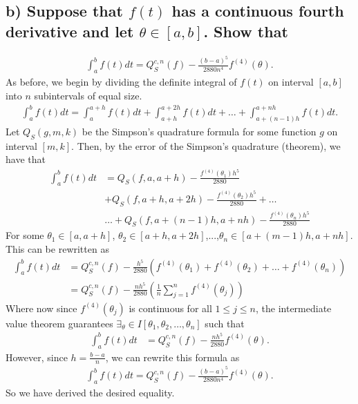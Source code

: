\documentclass[11pt, letterpaper]{article}
\begin{document}
\subsection*{b) \normalfont Suppose that $f(t)$ has a continuous fourth derivative and let $\theta\in[a,b]$. Show that}
\begin{align*}
    \int_a^b f(t)dt=Q_S^{c,n}(f)-\frac{(b-a)^5}{2880n^4}f^{(4)}(\theta).
\end{align*}
As before, we begin by dividing the definite integral of $f(t)$ on interval $[a,b]$ into $n$ subintervals of equal size.
\begin{align*}
    \int_a^b f(t)dt=\int_a^{a+h} f(t)dt +\int_{a+h}^{a+2h}f(t)dt +\dots+ \int_{a+(n-1)h}^{a+nh}f(t)dt.
\end{align*}
Let $Q_S(g,m,k)$ be the Simpson's quadrature formula for some function $g$ on interval $[m,k]$. Then, by the error of the Simpson's quadrature (theorem), we have that
\begin{align*}
    \int_a^b f(t)dt&=Q_S(f,a,a+h)-\frac{f^{(4)}(\theta_1)h^5}{2880}\\
    &+Q_S(f,a+h,a+2h)-\frac{f^{(4)}(\theta_2)h^5}{2880}+\dots\\
    &\dots+Q_S(f,a+(n-1)h,a+nh)-\frac{f^{(4)}(\theta_n)h^5}{2880}
\end{align*}
For some $\theta_1\in[a,a+h]$, $\theta_2\in[a+h,a+2h]$,...,$\theta_n\in[a+(m-1)h,a+nh]$. This can be rewritten as
\begin{align*}
    \int_a^bf(t)dt&=Q_S^{c,n}(f)-\frac{h^5}{2880}(f^{(4)}(\theta_1)+f^{(4)}(\theta_2)+\dots+f^{(4)}(\theta_n))\\
    &=Q_S^{c,n}(f)-\frac{nh^5}{2880}\left(\frac{1}{n}\sum_{j=1}^n f^{(4)}(\theta_j)\right)
\end{align*}
Where now since $f^{(4)}(\theta_j)$ is continuous for all $1\leq j\leq n$, the intermediate value theorem guarantees $\exists_\theta\in I[\theta_1,\theta_2,\dots,\theta_n]$ such that
\begin{align*}
    \int_a^bf(t)dt&=Q_S^{c,n}(f)-\frac{nh^5}{2880}f^{(4)}(\theta).
\end{align*}
However, since $h=\frac{b-a}{n}$, we can rewrite this formula as
\begin{align*}
    \int_a^bf(t)dt=Q_S^{c,n}(f)-\frac{(b-a)^5}{2880n^4}f^{(4)}(\theta).
\end{align*}
So we have derived the desired equality.
\end{document}
